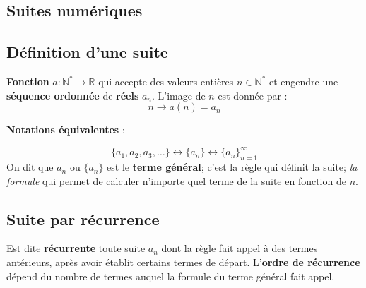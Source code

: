 \documentclass{report}
\begin{document}
\titleformat{\section}[block]{\normalsize\bfseries}{}{0pt}{}


\begin{multicols*}{3}
    \footnotesize

    \chapter{Suites numériques}
    \section{Définition d'une suite}
        \textbf{Fonction} $a \colon \mathbb{N}^* 
        \rightarrow \mathbb{R}$ qui accepte des valeurs entières 
        $n \in \mathbb{N}^*$ et engendre une \textbf{séquence ordonnée} de 
        \textbf{réels} $a_n$. L'image de $n$ est donnée par :
        \[%
           n \rightarrow a(n) = a_n 
        \]%
        \begin{center}
        \textbf{Notations équivalentes} :    
        \end{center}
        \[%
            \{a_1, a_2, a_3,\dots\} \leftrightarrow  \{ a_n \} 
                            \leftrightarrow  \{a_n\}_{ n = 1}^{\infty }
        \]%
        On dit que $a_n$ ou $\{a_n\}$ est le \textbf{terme général}; c'est la 
        règle qui définit la suite; \textit{la formule}  qui permet de calculer 
        n'importe quel terme de la suite en fonction de $n$. 

    \vspace{-1em}
    \section{Suite par récurrence}
    Est dite \textbf{récurrente} toute suite $a_n$ dont la 
    règle fait appel à des termes antérieurs, après avoir 
    établit certains termes de départ. L'\textbf{ordre de récurrence}
    dépend du nombre de termes auquel la formule du terme général 
    fait appel.


\end{multicols*}
\end{document}
